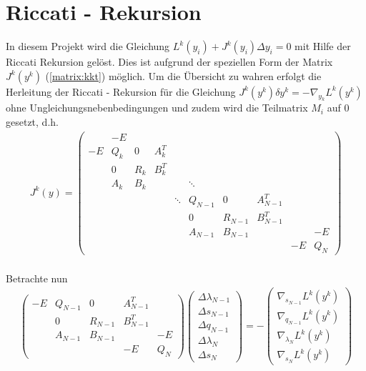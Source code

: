 \section{Riccati - Rekursion}
In diesem Projekt wird die Gleichung $L^{k}(y_{i}) + J^{k}(y_{i}) \Delta y_{i} = 0$ mit Hilfe der Riccati Rekursion gelöst. Dies ist aufgrund der speziellen Form der Matrix $J^k(y^k)$ (\ref{matrix:kkt}) möglich.
Um die Übersicht zu wahren erfolgt die Herleitung der Riccati - Rekursion für die Gleichung $J^k(y^k) \delta y^k = - \nabla_{y_k} L^k(y^k)$ ohne Ungleichungsnebenbedingungen und zudem wird die Teilmatrix $M_i$ auf 0 gesetzt, d.h.
\begin{align}
    J^{k}(y) = 
  \begin{pmatrix}
    & -E &   &    &  &   &   &     \\
  -E& Q_k & 0   & A_k^{T} &  &     &    &       \\
    & 0 & R_k  &   B_k^{T} &  &   &   &      \\
    & A_k & B_k &  &   & \ddots &   &   &    \\
    &  &  &   & \ddots & Q_{N-1} & 0  & A_{N-1}^{T}  &     \\
    &  &  &  &      & 0  & R_{N-1} & B_{N-1}^{T}  &     \\
    &  &  &  &      & A_{N-1} & B_{N-1}  & &    & -E \\
    &  &  &  & &  & &  & -E & Q_{N}
  \end{pmatrix}
  \end{align}
\\
Betrachte nun
  \begin{align*}
  \begin{pmatrix}
  -E & Q_{N-1} & 0 & A_{N-1}^{T} &  \\
     & 0 & R_{N-1} & B_{N-1}^{T} &  \\
     & A_{N-1} & B_{N-1} &   & -E \\
     &   &   & -E & Q_N
  \end{pmatrix}
  \begin{pmatrix}
  \Delta \lambda_{N-1} \\
  \Delta s_{N-1} \\
  \Delta q_{N-1} \\
  \Delta \lambda_{N} \\
  \Delta s_N
  \end{pmatrix} =-
  \begin{pmatrix}
  \nabla_{s_{N-1}} L^{k}(y^{k}) \\
  \nabla_{q_{N-1}} L^{k}(y^{k}) \\
  \nabla_{\lambda_{N}} L^{k}(y^{k}) \\ 
  \nabla_{s_{N}} L^{k}(y^{k})
  \end{pmatrix}
  \end{align*}
